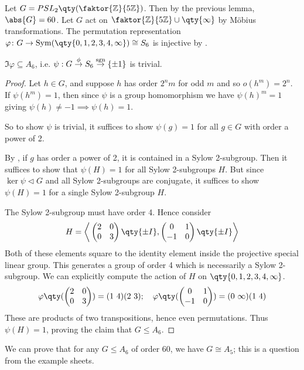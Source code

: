 \begin{example}
	Let $G = PSL_2\qty(\faktor{\mathbb Z}{5\mathbb Z})$.
	Then by the previous lemma, $\abs{G} = 60$.
	Let $G$ act on $\faktor{\mathbb Z}{5\mathbb Z} \cup \qty{\infty}$ by M\"obius transformations.
	The permutation representation $\varphi \colon G \to \Sym(\qty{0,1,2,3,4,\infty}) \cong S_6$ is injective by .

	\begin{claim}
		$\Im \varphi \subseteq A_6$, i.e. $\psi : G \overset{\phi}\to S_6 \overset{\operatorname{sgn}}\to \{\pm 1\}$ is trivial.
	\end{claim} 

	\begin{proof}
		Let $h\in G$, and suppose $h$ has order $2^n m$ for odd $m$ and so $o(h^m) = 2^n$.
		If $\psi(h^m) = 1$, then since $\psi$ is a group homomorphism we have $\psi(h)^m = 1$ giving $\psi(h) \neq -1 \implies \psi(h) = 1$.

		So to show $\psi$ is trivial, it suffices to show $\psi(g) = 1$ for all $g \in G$ with order a power of 2.

		By , if $g$ has order a power of 2, it is contained in a Sylow 2-subgroup.
		Then it suffices to show that $\psi(H) = 1$ for all Sylow 2-subgroups $H$.
		But since $\ker \psi \triangleleft G$ and all Sylow 2-subgroups are conjugate, it suffices to show $\psi(H) = 1$ for a single Sylow 2-subgroup $H$.

		The Sylow 2-subgroup must have order 4.
		Hence consider
		\begin{align*}
			H = \genset{ \begin{pmatrix}
					2 & 0 \\
					0 & 3
				\end{pmatrix} \qty{\pm I}, \begin{pmatrix}
					0  & 1 \\
					-1 & 0
				\end{pmatrix} \qty{\pm I} }
		\end{align*}
		Both of these elements square to the identity element inside the projective special linear group.
		This generates a group of order 4 which is necessarily a Sylow 2-subgroup.
		We can explicitly compute the action of $H$ on $\qty{0,1,2,3,4,\infty}$.
		\begin{align*}
			\varphi\qty(\begin{pmatrix}
					2 & 0 \\
					0 & 3
				\end{pmatrix}) = (1\ 4)(2\ 3);\quad \varphi\qty(\begin{pmatrix}
					0  & 1 \\
					-1 & 0
				\end{pmatrix}) = (0\ \infty)(1\ 4)
		\end{align*}
		These are products of two transpositions, hence even permutations.
		Thus $\psi(H) = 1$, proving the claim that $G \leq A_6$.
	\end{proof} 

	We can prove that for any $G \leq A_6$ of order 60, we have $G \cong A_5$; this is a question from the example sheets.
\end{example}

